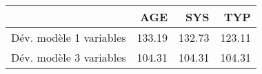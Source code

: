 \begin{tabular}{rrrr}
  \hline
 & AGE & SYS & TYP \\ 
  \hline
Dév. modèle 1 variables & 133.19 & 132.73 & 123.11 \\ 
  Dév. modèle 3 variables & 104.31 & 104.31 & 104.31 \\ 
   \hline
\end{tabular}
